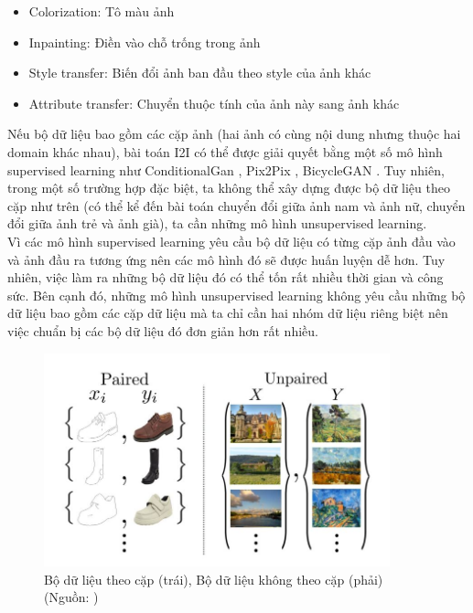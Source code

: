 {\begin{itemize}[leftmargin=0cm,itemindent=.5cm,labelwidth=\itemindent,labelsep=0cm,align=left]
        \item Colorization: Tô màu ảnh
        \item Inpainting: Điền vào chỗ trống trong ảnh
        \item Style transfer: Biến đổi ảnh ban đầu theo style của ảnh khác
        \item Attribute transfer: Chuyển thuộc tính của ảnh này sang ảnh khác
    \end{itemize}
    \noindent Nếu bộ dữ liệu bao gồm các cặp ảnh (hai ảnh có cùng nội dung nhưng thuộc hai domain khác nhau), bài toán I2I có thể được giải quyết bằng một số mô hình supervised learning như ConditionalGan \cite{conditional-gan}, Pix2Pix \cite{high-resolution-conditional-gan}, BicycleGAN \cite{bicyle-gan}. Tuy nhiên, trong một số trường hợp đặc biệt, ta không thể xây dựng được bộ dữ liệu theo cặp như trên (có thể kể đến bài toán chuyển đổi giữa ảnh nam và ảnh nữ, chuyển đổi giữa ảnh trẻ và ảnh già), ta cần những mô hình unsupervised learning.\\
    Vì các mô hình supervised learning yêu cầu bộ dữ liệu có từng cặp ảnh đầu vào và ảnh đầu ra tương ứng nên các mô hình đó sẽ được huấn luyện dễ hơn. Tuy nhiên, việc làm ra những bộ dữ liệu đó có thể tốn rất nhiều thời gian và công sức. Bên cạnh đó, những mô hình unsupervised learning không yêu cầu những bộ dữ liệu bao gồm các cặp dữ liệu mà ta chỉ cần hai nhóm dữ liệu riêng biệt nên việc chuẩn bị các bộ dữ liệu đó đơn giản hơn rất nhiều.

    \begin{figure}[H]
    \centering
    \includegraphics[width=10cm]{images/img_translation.jpg}
    \caption{Bộ dữ liệu theo cặp (trái), Bộ dữ liệu không theo cặp (phải) (Nguồn: \cite{cycle-gan})}
    \label{fig:img_translation}
    \end{figure}
    
}
